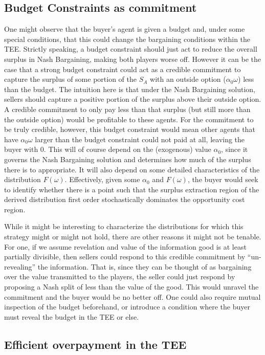 \documentclass{article}
\begin{document}
\subsection{Budget Constraints as commitment}
One might observe that the buyer's agent is given a budget and, under some special conditions, that this could change the bargaining conditions within the TEE. Strictly speaking, a budget constraint should just act to reduce the overall surplus in Nash Bargaining, making both players worse off. However it can be the case that a strong budget constraint could act as a credible commitment to capture the surplus of some portion of the $S_A$ with an outside option ($\alpha_0 \omega$) less than the budget. The intuition here is that under the Nash Bargaining solution, sellers should capture a positive portion of the surplus above their outside option. A credible commitment to only pay less than that surplus (but still more than the outside option) would be profitable to these agents. For the commitment to be truly credible, however, this budget constraint would mean other agents that have $\alpha_0 \omega$ larger than the budget constraint could not paid at all, leaving the buyer with $0$. This will of course depend on the (exogenous) value $\alpha_0$, since it governs the Nash Bargaining solution and determines how much of the surplus there is to appropriate. It will also depend on some detailed characteristics of the distribution $F(\omega)$. Effectively, given some $\alpha_0$ and $F(\omega)$, the buyer would seek to identify whether there is a point such that the surplus extraction region of the derived distribution first order stochastically dominates the opportunity cost region.

While it might be interesting to characterize the distributions for which this strategy might or might not hold, there are other reasons it might not be tenable. For one, if we assume revelation and value of the information good is at least partially divisible, then sellers could respond to this credible commitment by ``un-revealing'' the information. That is, since they can be thought of as bargaining over the value transmitted to the players, the seller could just respond by proposing a Nash split of less than the value of the good. This would unravel the commitment and the buyer would be no better off. One could also require mutual inspection of the budget beforehand, or introduce a condition where the buyer must reveal the budget in the TEE or else.

\subsection{Efficient overpayment in the TEE}
\label{app:buyer-overpay-d}
\end{document}
